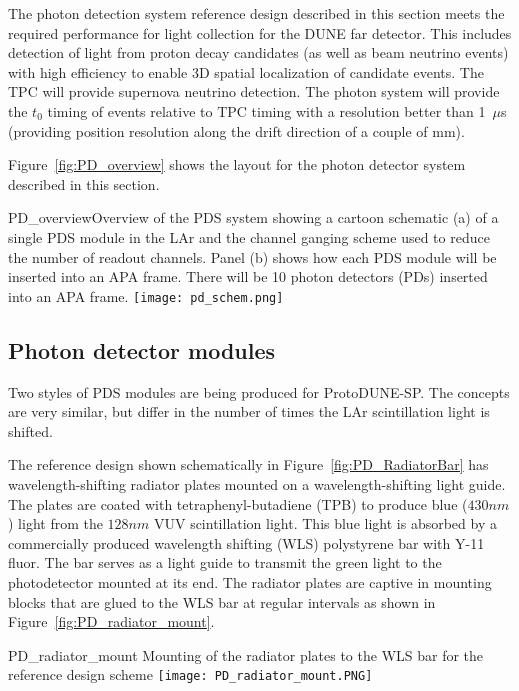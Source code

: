The photon detection system reference design described in this section
meets the required performance for light collection for the DUNE far
detector. This includes detection of light from proton decay
candidates (as well as beam neutrino events) with high efficiency to
enable 3D spatial localization of candidate events. The TPC will
provide supernova neutrino detection. 
The photon system will provide the $t_0$ timing of
events relative to TPC timing with a resolution better than 1~$\mu$s
(providing position resolution along the drift direction of a couple of mm). 

Figure~\ref{fig:PD_overview} shows the layout for the photon detector
system described in this section. %
\begin{cdrfigure}{PD_overview}{Overview of the PDS
    system showing a cartoon schematic (a) of a single PDS module
    in the LAr and the channel ganging scheme used to reduce the
    number of readout channels. Panel (b) shows how each PDS module
    will be inserted into an APA frame. There will be 10 photon detectors (PDs) inserted
    into an APA frame.}
\texttt{[image: pd\_schem.png]}
\end{cdrfigure}

\subsection{Photon detector modules}

Two styles of PDS %
modules are being produced for ProtoDUNE-SP.  
The concepts are very similar, but differ in the number of times the LAr scintillation 
light is shifted.  

The reference design shown schematically in Figure~\ref{fig:PD_RadiatorBar}
has wavelength-shifting radiator plates mounted on a wavelength-shifting light guide.
The plates are coated 
with tetraphenyl-butadiene (TPB) to produce blue ($430nm$) light from the $128nm$ VUV 
scintillation light.  
This blue light is absorbed by a commercially produced wavelength shifting (WLS)
polystyrene bar with Y-11 fluor.  
The bar serves as a light guide to transmit the green light to the photodetector 
mounted at its end.
The radiator plates are captive in mounting blocks that are glued to the WLS bar
at regular intervals as shown in Figure~\ref{fig:PD_radiator_mount}.
\begin{cdrfigure}{PD_radiator_mount}
  {Mounting of the radiator plates to the WLS bar for the reference design scheme}
\texttt{[image: PD\_radiator\_mount.PNG]}
\end{cdrfigure}

